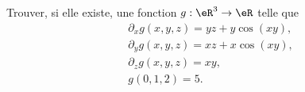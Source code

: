 \begin{exercice}\label{exocontrolecontinu0008}
 

Trouver, si elle existe, une fonction $g: \eR^3\to\eR$ telle que 
\begin{equation}
  \begin{aligned}
    &\partial_xg(x,y,z)= yz+y\cos(xy), \\
    &\partial_yg(x,y,z)=  xz+x\cos(xy),\\
    &\partial_zg(x,y,z)=xy,\\
    & g(0,1,2) =5.
  \end{aligned}
\end{equation}
\end{exercice}
